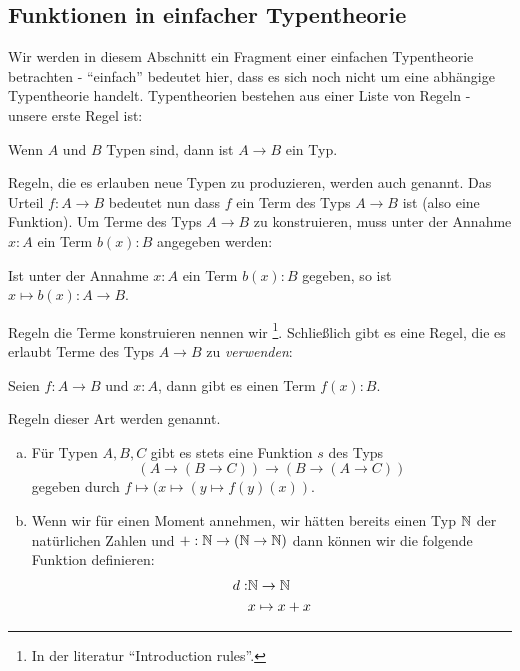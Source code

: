 \subsection{Funktionen in einfacher Typentheorie}
Wir werden in diesem Abschnitt ein Fragment einer einfachen Typentheorie betrachten - ``einfach'' bedeutet hier, dass es sich noch nicht um eine abhängige Typentheorie handelt.
Typentheorien bestehen aus einer Liste von Regeln - unsere erste Regel ist:
\begin{center}
 Wenn $A$ und $B$ Typen sind, dann ist $A\to B$ ein Typ.
\end{center}
Regeln, die es erlauben neue Typen zu produzieren, werden auch  genannt.
Das Urteil $f:A\to B$ bedeutet nun dass $f$ ein Term des Typs $A\to B$ ist (also eine Funktion).
Um Terme des Typs $A\to B$ zu konstruieren, muss unter der Annahme $x:A$ ein Term $b(x):B$ angegeben werden:
\begin{center}
  Ist unter der Annahme $x:A$ ein Term $b(x):B$ gegeben, so ist $x\mapsto b(x) : A\to B$.
\end{center}
Regeln die Terme konstruieren nennen wir \footnote{In der literatur ``Introduction rules''.}.
Schließlich gibt es eine Regel, die es erlaubt Terme des Typs $A\to B$ zu \emph{verwenden}:
\begin{center}
  Seien $f:A\to B$ und $x:A$, dann gibt es einen Term $f(x):B$.
\end{center}
Regeln dieser Art werden  genannt.
\begin{beispiel}
\begin{enumerate}[(a)]
\item Für Typen $A,B,C$ gibt es stets eine Funktion $s$ des Typs
  \[
    (A\to (B\to C)) \to (B\to (A\to C))
  \]
  gegeben durch $f\mapsto (x\mapsto (y \mapsto f(y)(x))$.
\item Wenn wir für einen Moment annehmen, wir hätten bereits einen Typ $\mathbb{N}$ der natürlichen Zahlen und $+:\mathbb{N}\to(\mathbb{N}\to \mathbb{N})$ dann können wir die folgende Funktion definieren:
\begin{align*}
  d:&\mathbb{N}\to\mathbb{N} \\
    & x\mapsto x+x
\end{align*}
\end{enumerate}
\end{beispiel}

